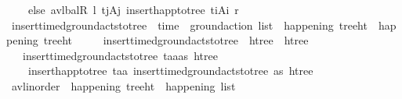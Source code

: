 \begin{isabellebody}
\ \ \ \ else\ avl{\isacharunderscore}{\kern0pt}balR\ l\ {\isacharparenleft}{\kern0pt}t\isactrlsub j{\isacharcomma}{\kern0pt}A\isactrlsub j{\isacharparenright}{\kern0pt}\ {\isacharparenleft}{\kern0pt}insert{\isacharunderscore}{\kern0pt}happ{\isacharunderscore}{\kern0pt}to{\isacharunderscore}{\kern0pt}tree\ {\isacharparenleft}{\kern0pt}t\isactrlsub i{\isacharcomma}{\kern0pt}A\isactrlsub i{\isacharparenright}{\kern0pt}\ r{\isacharparenright}{\kern0pt}{\isacharparenright}{\kern0pt}{\isachardoublequoteclose}\isanewline
\isanewline
\ \ \isamarkupfalse%
\ insert{\isacharunderscore}{\kern0pt}timed{\isacharunderscore}{\kern0pt}ground{\isacharunderscore}{\kern0pt}acts{\isacharunderscore}{\kern0pt}to{\isacharunderscore}{\kern0pt}tree\ {\isacharcolon}{\kern0pt}{\isacharcolon}{\kern0pt}\ {\isachardoublequoteopen}{\isacharparenleft}{\kern0pt}time\ {\isasymtimes}\ ground{\isacharunderscore}{\kern0pt}action{\isacharparenright}{\kern0pt}\ list\ {\isasymRightarrow}\ happening\ tree{\isacharunderscore}{\kern0pt}ht\ {\isasymRightarrow}\ happening\ tree{\isacharunderscore}{\kern0pt}ht{\isachardoublequoteclose}\ \isanewline
\ \ \ \ {\isachardoublequoteopen}insert{\isacharunderscore}{\kern0pt}timed{\isacharunderscore}{\kern0pt}ground{\isacharunderscore}{\kern0pt}acts{\isacharunderscore}{\kern0pt}to{\isacharunderscore}{\kern0pt}tree\ {\isacharbrackleft}{\kern0pt}{\isacharbrackright}{\kern0pt}\ htree\ {\isacharequal}{\kern0pt}\ htree{\isachardoublequoteclose}\isanewline
\ \ {\isacharbar}{\kern0pt}\ {\isachardoublequoteopen}insert{\isacharunderscore}{\kern0pt}timed{\isacharunderscore}{\kern0pt}ground{\isacharunderscore}{\kern0pt}acts{\isacharunderscore}{\kern0pt}to{\isacharunderscore}{\kern0pt}tree\ {\isacharparenleft}{\kern0pt}{\isacharparenleft}{\kern0pt}t\isactrlsub a{\isacharcomma}{\kern0pt}a{\isacharparenright}{\kern0pt}{\isacharhash}{\kern0pt}as{\isacharparenright}{\kern0pt}\ htree\ {\isacharequal}{\kern0pt}\ \isanewline
\ \ \ \ insert{\isacharunderscore}{\kern0pt}happ{\isacharunderscore}{\kern0pt}to{\isacharunderscore}{\kern0pt}tree\ {\isacharparenleft}{\kern0pt}t\isactrlsub a{\isacharcomma}{\kern0pt}{\isacharbrackleft}{\kern0pt}a{\isacharbrackright}{\kern0pt}{\isacharparenright}{\kern0pt}\ {\isacharparenleft}{\kern0pt}insert{\isacharunderscore}{\kern0pt}timed{\isacharunderscore}{\kern0pt}ground{\isacharunderscore}{\kern0pt}acts{\isacharunderscore}{\kern0pt}to{\isacharunderscore}{\kern0pt}tree\ as\ htree{\isacharparenright}{\kern0pt}{\isachardoublequoteclose}\isanewline
\isanewline
\ \ \isamarkupfalse%
\ avl{\isacharunderscore}{\kern0pt}inorder\ {\isacharcolon}{\kern0pt}{\isacharcolon}{\kern0pt}\ {\isachardoublequoteopen}happening\ tree{\isacharunderscore}{\kern0pt}ht\ {\isasymRightarrow}\ happening\ list{\isachardoublequoteclose}\ \ \isanewline

\end{isabellebody}
